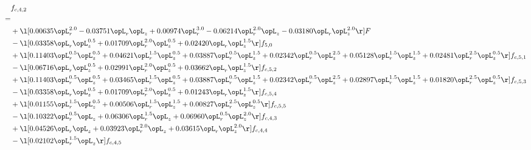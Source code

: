 \begin{alignat}{2} 
\label{eq:f_42_2} 
& f_{c,4,2} \nonumber \\ 
 = \\ 
& + \l[  0.00635 \opL_r^{2.0}   -0.03751 \opL_r \opL_z +  0.00974 \opL_r^{3.0}   -0.06214 \opL_r^{2.0} \opL_z   -0.03180 \opL_r \opL_z^{2.0}  \r] F \nonumber \\ 
& - \l[  0.03358 \opL_r \opL_z^{0.5} +  0.01709 \opL_r^{2.0} \opL_z^{0.5} +  0.02420 \opL_r \opL_z^{1.5}  \r] f_{5,0} \nonumber \\ 
& + \l[  0.11403 \opL_r^{0.5} \opL_z^{0.5} +  0.04621 \opL_r^{1.5} \opL_z^{0.5} +  0.03887 \opL_r^{0.5} \opL_z^{1.5} +  0.02342 \opL_r^{0.5} \opL_z^{2.5} +  0.05128 \opL_r^{1.5} \opL_z^{1.5} +  0.02481 \opL_r^{2.5} \opL_z^{0.5}  \r] f_{c,5,1} \nonumber \\ 
& - \l[  0.06716 \opL_r \opL_z^{0.5} +  0.02991 \opL_r^{2.0} \opL_z^{0.5} +  0.03662 \opL_r \opL_z^{1.5}  \r] f_{c,5,2} \nonumber \\ 
& + \l[  0.11403 \opL_r^{0.5} \opL_z^{0.5} +  0.03465 \opL_r^{1.5} \opL_z^{0.5} +  0.03887 \opL_r^{0.5} \opL_z^{1.5} +  0.02342 \opL_r^{0.5} \opL_z^{2.5} +  0.02897 \opL_r^{1.5} \opL_z^{1.5} +  0.01820 \opL_r^{2.5} \opL_z^{0.5}  \r] f_{c,5,3} \nonumber \\ 
& - \l[  0.03358 \opL_r \opL_z^{0.5} +  0.01709 \opL_r^{2.0} \opL_z^{0.5} +  0.01243 \opL_r \opL_z^{1.5}  \r] f_{c,5,4} \nonumber \\ 
& + \l[  0.01155 \opL_r^{1.5} \opL_z^{0.5} +  0.00506 \opL_r^{1.5} \opL_z^{1.5} +  0.00827 \opL_r^{2.5} \opL_z^{0.5}  \r] f_{c,5,5} \nonumber \\ 
& - \l[  0.10322 \opL_r^{0.5} \opL_z +  0.06306 \opL_r^{1.5} \opL_z +  0.06960 \opL_r^{0.5} \opL_z^{2.0}  \r] f_{c,4,3} \nonumber \\ 
& + \l[  0.04526 \opL_r \opL_z +  0.03923 \opL_r^{2.0} \opL_z +  0.03615 \opL_r \opL_z^{2.0}  \r] f_{c,4,4} \nonumber \\ 
& - \l[  0.02102 \opL_r^{1.5} \opL_z  \r] f_{c,4,5} \nonumber \\ 
\end{alignat} 


